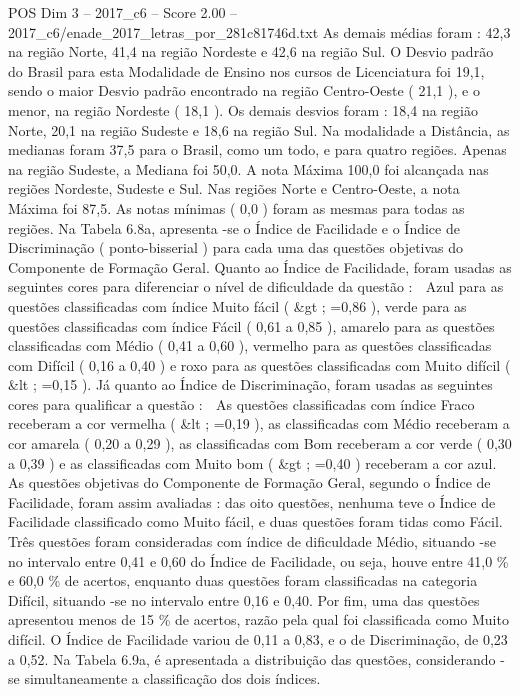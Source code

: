\begin{textsample}{POS Dim 3 – 2017\_c6 – Score 2.00 – 2017\_c6/enade\_2017\_letras\_por\_281c81746d.txt}
As demais médias foram : 42,3 na região Norte, 41,4 na região Nordeste e 42,6 na região Sul.
O Desvio padrão do Brasil para esta Modalidade de Ensino nos cursos de Licenciatura foi 19,1, sendo o maior Desvio padrão encontrado na região Centro-Oeste ( 21,1 ), e o menor, na região Nordeste ( 18,1 ).
Os demais desvios foram : 18,4 na região Norte, 20,1 na região Sudeste e 18,6 na região Sul.
Na modalidade a Distância, as medianas foram 37,5 para o Brasil, como um todo, e para quatro regiões.
Apenas na região Sudeste, a Mediana foi 50,0.
A nota Máxima 100,0 foi alcançada nas regiões Nordeste, Sudeste e Sul.
Nas regiões Norte e Centro-Oeste, a nota Máxima foi 87,5.
As notas mínimas ( 0,0 ) foram as mesmas para todas as regiões.
Na Tabela 6.8a, apresenta -se o Índice de Facilidade e o Índice de Discriminação ( ponto-bisserial ) para cada uma das questões objetivas do Componente de Formação Geral.
Quanto ao Índice de Facilidade, foram usadas as seguintes cores para diferenciar o nível de dificuldade da questão :  Azul para as questões classificadas com índice Muito fácil ( \&gt ; =0,86 ), verde para as questões classificadas com índice Fácil ( 0,61 a 0,85 ), amarelo para as questões classificadas com Médio ( 0,41 a 0,60 ), vermelho para as questões classificadas com Difícil ( 0,16 a 0,40 ) e roxo para as questões classificadas com Muito difícil ( \&lt ; =0,15 ).
Já quanto ao Índice de Discriminação, foram usadas as seguintes cores para qualificar a questão :  As questões classificadas com índice Fraco receberam a cor vermelha ( \&lt ; =0,19 ), as classificadas com Médio receberam a cor amarela ( 0,20 a 0,29 ), as classificadas com Bom receberam a cor verde ( 0,30 a 0,39 ) e as classificadas com Muito bom ( \&gt ; =0,40 ) receberam a cor azul.
As questões objetivas do Componente de Formação Geral, segundo o Índice de Facilidade, foram assim avaliadas : das oito questões, nenhuma teve o Índice de Facilidade classificado como Muito fácil, e duas questões foram tidas como Fácil.
Três questões foram consideradas com índice de dificuldade Médio, situando -se no intervalo entre 0,41 e 0,60 do Índice de Facilidade, ou seja, houve entre 41,0 \% e 60,0 \% de acertos, enquanto duas questões foram classificadas na categoria Difícil, situando -se no intervalo entre 0,16 e 0,40.
Por fim, uma das questões apresentou menos de 15 \% de acertos, razão pela qual foi classificada como Muito difícil.
O Índice de Facilidade variou de 0,11 a 0,83, e o de Discriminação, de 0,23 a 0,52.
Na Tabela 6.9a, é apresentada a distribuição das questões, considerando -se simultaneamente a classificação dos dois índices.

\end{textsample}
